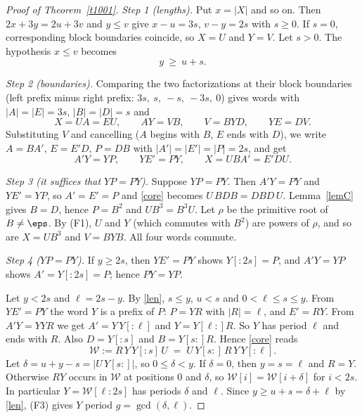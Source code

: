 \begin{proof}[Proof of Theorem~\ref{t1001}]
\emph{Step 1 (lengths).} Put \(x=|X|\) and so on. Then \(2x+3y=2u+3v\) and \(y\le v\) give \(x-u=3s\), \(v-y=2s\) with \(s\ge0\). If \(s=0\), corresponding block boundaries coincide, so \(X=U\) and \(Y=V\). Let \(s>0\). The hypothesis \(x\le v\) becomes
\begin{equation}\label{len}
 y\ \ge\ u+s .
\end{equation}

\emph{Step 2 (boundaries).} Comparing the two factorizations at their block boundaries (left prefix minus right prefix: \(3s,\ s,\ -s,\ -3s,\ 0\)) gives words with \(|A|=|E|=3s\), \(|B|=|D|=s\) and
\[
 X=UA=EU,\qquad AY=VB,\qquad V=BYD,\qquad YE=DV .
\]
Substituting \(V\) and cancelling (\(A\) begins with \(B\), \(E\) ends with \(D\)), we write \(A=BA'\), \(E=E'D\), \(P=DB\) with \(|A'|=|E'|=|P|=2s\), and get
\begin{equation}\label{core}
 A'Y=YP,\qquad YE'=PY,\qquad X=UBA'=E'DU .
\end{equation}

\emph{Step 3 (it suffices that \(YP=PY\)).} Suppose \(YP=PY\). Then \(A'Y=PY\) and \(YE'=YP\), so \(A'=E'=P\) and \eqref{core} becomes \(U\,BDB=DBD\,U\). Lemma~\ref{lemC} gives \(B=D\), hence \(P=B^2\) and \(UB^3=B^3U\). Let \(\rho\) be the primitive root of \(B\ne\eps\). By (F1), \(U\) and \(Y\) (which commutes with \(B^2\)) are powers of \(\rho\), and so are \(X=UB^3\) and \(V=BYB\). All four words commute.

\emph{Step 4 (\(YP=PY\)).} If \(y\ge2s\), then \(YE'=PY\) shows \(Y[{:}2s]=P\), and \(A'Y=YP\) shows \(A'=Y[{:}2s]=P\); hence \(PY=YP\).

Let \(y<2s\) and \(\ell=2s-y\). By \eqref{len}, \(s\le y\), \(u<s\) and \(0<\ell\le s\le y\). From \(YE'=PY\) the word \(Y\) is a prefix of \(P\): \(P=YR\) with \(|R|=\ell\), and \(E'=RY\). From \(A'Y=YYR\) we get \(A'=Y\,Y[{:}\ell]\) and \(Y=Y[\ell{:}]R\). So \(Y\) has period \(\ell\) and ends with \(R\). Also \(D=Y[{:}s]\) and \(B=Y[s{:}]R\). Hence \eqref{core} reads
\[
 \mathcal W:=R\,Y\,Y[{:}s]\,U\;=\;U\,Y[s{:}]\,R\,Y\,Y[{:}\ell].
\]
Let \(\delta=u+y-s=|U\,Y[s{:}]|\), so \(0\le\delta<y\). If \(\delta=0\), then \(y=s=\ell\) and \(R=Y\). Otherwise \(RY\) occurs in \(\mathcal W\) at positions \(0\) and \(\delta\), so \(\mathcal W[i]=\mathcal W[i+\delta]\) for \(i<2s\). In particular \(Y=\mathcal W[\ell{:}2s]\) has periods \(\delta\) and \(\ell\). Since \(y\ge u+s=\delta+\ell\) by \eqref{len}, (F3) gives \(Y\) period \(g=\gcd(\delta,\ell)\).


\end{proof}
